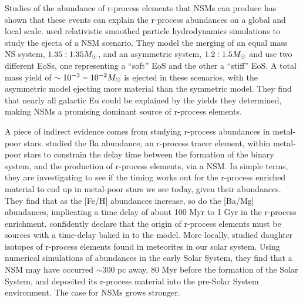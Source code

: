 \documentclass[fleqn,usenatbib]{mnras}
\begin{document}
Studies of the abundance of r-process elements that NSMs can produce has shown that these events can explain the r-process abundances on a global and local scale. \citet{Goriely11} used relativistic smoothed particle hydrodynamics simulations to study the ejecta of a NSM scenario. They model the merging of an equal mass NS system, $1.35:1.35 \Ms$, and an asymmetric system, $1.2:1.5 \Ms$ and use two different EoSs, one representing a ``soft'' EoS and the other a ``stiff'' EoS. A total mass yield of $\sim 10^{-3} - 10^{-2} \Ms$ is ejected in these scenarios, with the asymmetric model ejecting more material than the symmetric model. They find that nearly all galactic Eu could be explained by the yields they determined, making NSMs a promising dominant source of r-process elements. 

A piece of indirect evidence comes from studying r-process abundances in metal-poor stars. \citet{Tarumi21} studied the Ba abundance, an r-process tracer element, within metal-poor stars to constrain the delay time between the formation of the binary system, and the production of r-process elements, via a NSM. In simple terms, they are investigating to see if the timing works out for the r-process enriched material to end up in metal-poor stars we see today, given their abundances. They find that as the [Fe/H] abundances increase, so do the [Ba/Mg] abundances, implicating a time delay of about 100 Myr to 1 Gyr in the r-process enrichment. \citet{Tarumi21} confidently declare that the origin of r-process elements must be sources with a time-delay baked in to the model. More locally, \citet{Bartos19} studied daughter isotopes of r-process elements found in meteorites in our solar system. Using numerical simulations of abundances in the early Solar System, they find that a NSM may have occurred $\sim 300$ pc away, 80 Myr before the formation of the Solar System, and deposited its r-process material into the pre-Solar System environment. The case for NSMs grows stronger.
\end{document}
